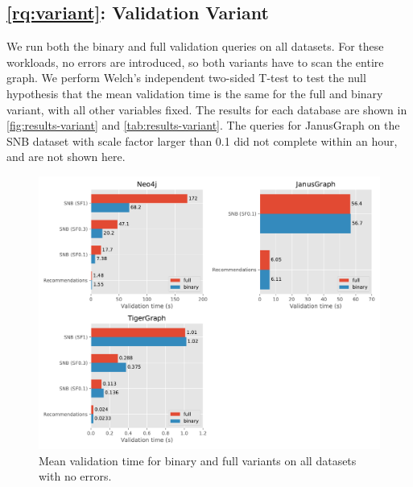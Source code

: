 \documentclass{report}
\theoremstyle{definition}
\begin{document}
\subsection{\ref*{rq:variant}: Validation Variant}

We run both the binary and full validation queries on all datasets. For these workloads, no errors are introduced, so both variants have to scan the entire graph. We perform Welch's independent two-sided T-test to test the null hypothesis that the mean validation time is the same for the full and binary variant, with all other variables fixed. The results for each database are shown in \autoref{fig:results-variant} and \autoref{tab:results-variant}. The queries for JanusGraph on the SNB dataset with scale factor larger than 0.1 did not complete within an hour, and are not shown here.

\begin{figure}[t]
  \centering
  \includegraphics[scale=0.5]{figures/results-variant.pdf}
  \caption[Mean validation time for full and binary variants]{Mean validation time for binary and full variants on all datasets with no errors.}
  \label{fig:results-variant}
\end{figure}
\end{document}
